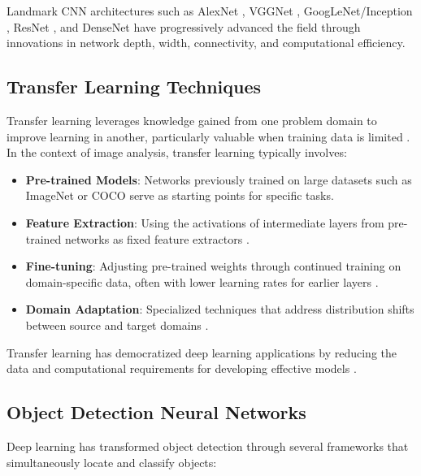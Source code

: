 Landmark CNN architectures such as AlexNet \cite{krizhevsky2012imagenet}, VGGNet \cite{simonyan2014very}, GoogLeNet/Inception \cite{szegedy2015going}, ResNet \cite{he2016deep}, and DenseNet \cite{huang2017densely} have progressively advanced the field through innovations in network depth, width, connectivity, and computational efficiency.

\subsection{Transfer Learning Techniques}
Transfer learning leverages knowledge gained from one problem domain to improve learning in another, particularly valuable when training data is limited \cite{pan2009survey}. In the context of image analysis, transfer learning typically involves:

\begin{itemize}
    \item \textbf{Pre-trained Models}: Networks previously trained on large datasets such as ImageNet \cite{deng2009imagenet} or COCO \cite{lin2014microsoft} serve as starting points for specific tasks.
    
    \item \textbf{Feature Extraction}: Using the activations of intermediate layers from pre-trained networks as fixed feature extractors \cite{yosinski2014transferable}.
    
    \item \textbf{Fine-tuning}: Adjusting pre-trained weights through continued training on domain-specific data, often with lower learning rates for earlier layers \cite{girshick2014rich}.
    
    \item \textbf{Domain Adaptation}: Specialized techniques that address distribution shifts between source and target domains \cite{wang2018deep}.
\end{itemize}

Transfer learning has democratized deep learning applications by reducing the data and computational requirements for developing effective models \cite{zhuang2020comprehensive}.

\subsection{Object Detection Neural Networks}
Deep learning has transformed object detection through several frameworks that simultaneously locate and classify objects:

